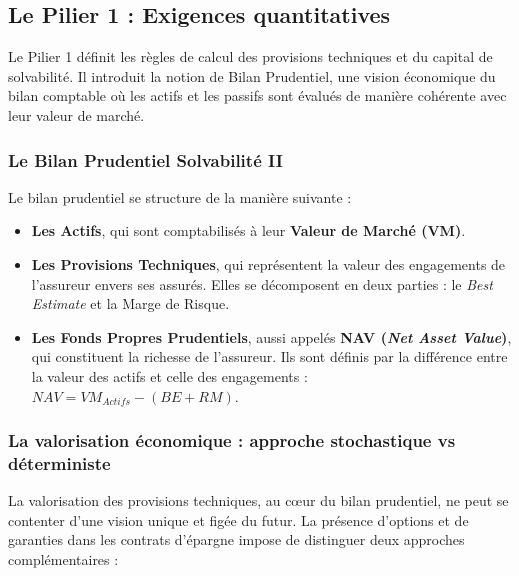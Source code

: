 \subsection{Le Pilier 1 : Exigences quantitatives}

Le Pilier 1 définit les règles de calcul des provisions techniques et du capital de solvabilité. Il introduit la notion de Bilan Prudentiel, une vision économique du bilan comptable où les actifs et les passifs sont évalués de manière cohérente avec leur valeur de marché.

\subsubsection{Le Bilan Prudentiel Solvabilité II}

Le bilan prudentiel se structure de la manière suivante :
\begin{itemize}
    \item \textbf{Les Actifs}, qui sont comptabilisés à leur \textbf{Valeur de Marché (VM)}.
    \item \textbf{Les Provisions Techniques}, qui représentent la valeur des engagements de l'assureur envers ses assurés. Elles se décomposent en deux parties : le \textit{Best Estimate} et la Marge de Risque.
    \item \textbf{Les Fonds Propres Prudentiels}, aussi appelés \textbf{NAV (\textit{Net Asset Value})}, qui constituent la richesse de l'assureur. Ils sont définis par la différence entre la valeur des actifs et celle des engagements : $NAV = VM_{Actifs} - (BE + RM)$.
\end{itemize}

\subsubsection{La valorisation économique : approche stochastique vs déterministe}

La valorisation des provisions techniques, au cœur du bilan prudentiel, ne peut se contenter d'une vision unique et figée du futur. La présence d'options et de garanties dans les contrats d'épargne impose de distinguer deux approches complémentaires :

